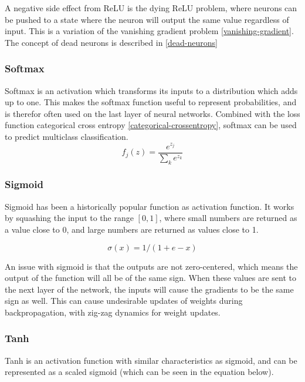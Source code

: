 A negative side effect from ReLU is the dying ReLU problem, where neurons can be pushed to a state where the neuron will output the same value regardless of input. This is a variation of the vanishing gradient problem \ref{vanishing-gradient}. The concept of dead neurons is described in \ref{dead-neurons}\cite{zeiler_rectified_2013}

\subsubsection{Softmax}

Softmax is an activation which transforms its inputs to a distribution which adds up to one. This makes the softmax function useful to represent probabilities, and is therefor often used on the last layer of neural networks. Combined with the loss function categorical cross entropy \ref{categorical-crossentropy}, softmax can be used to predict multiclass classification. \cite{_cs231n_????-1}
\begin{equation}
    f_j(z) = \frac{e^{z_j}}{\sum_k e^{z_k}}
\end{equation}



\subsubsection{Sigmoid}

Sigmoid has been a historically popular function as activation function. It works by squashing the input to the range $[0, 1]$, where small numbers are returned as a value close to 0, and large numbers are returned as values close to 1. 

\begin{equation}
    \sigma(x) = 1 / (1 + e - x)
\end{equation}

An issue with sigmoid is that the outputs are not zero-centered, which means the output of the function will all be of the same sign. When these values are sent to the next layer of the network, the inputs will cause the gradients to be the same sign as well. This can cause undesirable updates of weights during backpropagation, with zig-zag dynamics for weight updates. \cite{_neural_2018}

\subsubsection{Tanh}

Tanh is an activation function with similar characteristics as sigmoid, and can be represented as a scaled sigmoid (which can be seen in the equation below).

